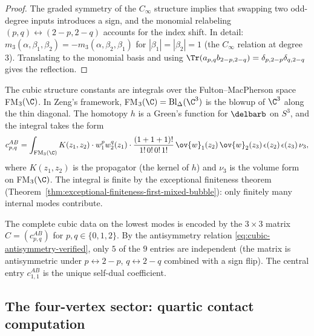 \begin{proof}
The graded symmetry of the $C_\infty$ structure implies that swapping two
odd-degree inputs introduces a sign, and the monomial relabeling
$(p,q) \leftrightarrow (2-p, 2-q)$ accounts for the index shift. In detail:
$m_3(\alpha, \beta_1, \beta_2) = -m_3(\alpha, \beta_2, \beta_1)$ for
$|\beta_1| = |\beta_2| = 1$ (the $C_\infty$ relation at degree~$3$). Translating to
the monomial basis and using $\Tr(a_{p,q} b_{2-p, 2-q}) = \delta_{p, 2-p}\delta_{q, 2-q}$
gives the reflection.
\end{proof}

\begin{computation}
The cubic structure constants are integrals over the Fulton--MacPherson space FM$_3(\C)$.
In Zeng's framework, FM$_3(\C) = \mathrm{Bl}_\Delta(\C^3)$ is the blowup of $\C^3$ along
the thin diagonal. The homotopy $h$ is a Green's function for $\delbarb$ on $S^3$, and
the integral takes the form
\begin{equation}
c^{AB}_{p,q} = \int_{\mathrm{FM}_3(\C)}
K(z_1, z_2) \cdot w_1^p w_2^q(z_1) \cdot
\frac{(1+1+1)!}{1!\,0!\,0!\,1!}\,
\ov{w}_1(z_2)\,\ov{w}_2(z_3)\,\epsilon(z_2)\,\epsilon(z_3)\,
\nu_3,
\end{equation}
where $K(z_1, z_2)$ is the propagator (the kernel of $h$) and $\nu_3$ is the volume
form on FM$_3(\C)$. The integral is finite by the exceptional finiteness theorem
(Theorem~\ref{thm:exceptional-finiteness-first-mixed-bubble}): only finitely many
internal modes contribute.
\end{computation}

\begin{remark}
The complete cubic data on the lowest modes is encoded by the $3 \times 3$ matrix
$C = (c^{AB}_{p,q})$ for $p,q \in \{0,1,2\}$. By the antisymmetry relation
\eqref{eq:cubic-antisymmetry-verified}, only $5$ of the $9$ entries are independent
(the matrix is antisymmetric under $p \leftrightarrow 2-p$, $q \leftrightarrow 2-q$
combined with a sign flip). The central entry $c^{AB}_{1,1}$ is the unique
self-dual coefficient.
\end{remark}

\subsection{The four-vertex sector: quartic contact computation}

